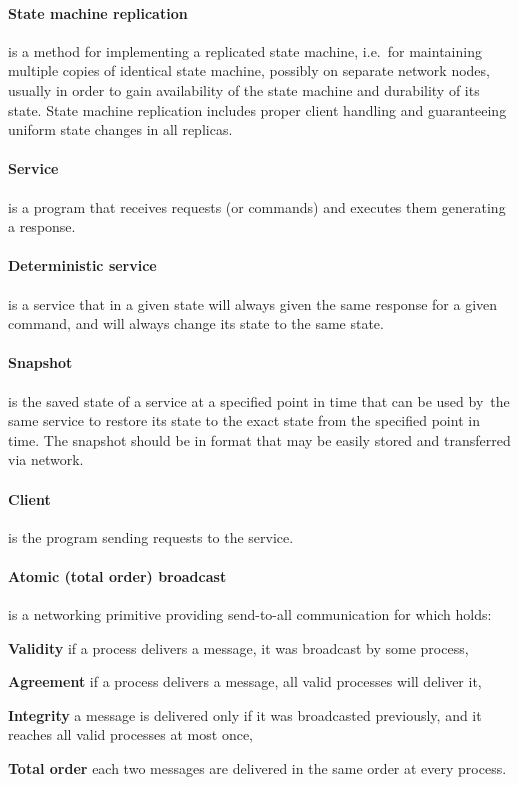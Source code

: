 \paragraph{State machine replication} is a method for implementing a replicated state machine, i.e.\ for maintaining multiple copies of identical state machine, possibly on separate network nodes, usually in order to gain availability of the state machine and durability of its state. State machine replication includes proper client handling and guaranteeing uniform state changes in all replicas.

\paragraph{Service}
is a program that receives requests (or commands) and executes them generating a response.

\paragraph{Deterministic service}
is a service that in a given state will always given the same response for a given command, and will always change its state to the same state.

\paragraph{Snapshot}
is the saved state of a service at a specified point in time that can be used by~the same service to restore its state to the exact state from the specified point in time. The snapshot should be in format that may be easily stored and transferred via network.

\paragraph{Client}
is the program sending requests to the service.

\paragraph{Atomic (total order) broadcast}
is a networking primitive providing send-to-all communication for which holds:
\begin{tightList}[\setlength{\leftmargin}{2\leftmargin}]
 \item[\textbf{Validity}] if a process delivers a message, it was broadcast by some process,
 \item[\textbf{Agreement}] if a process delivers a message, all valid processes will deliver it,
 \item[\textbf{Integrity}] a message is delivered only if it was broadcasted previously, and it reaches all valid processes at most once,
 \item[\textbf{Total order}] each two messages are delivered in the same order at every process.
\end{tightList}

